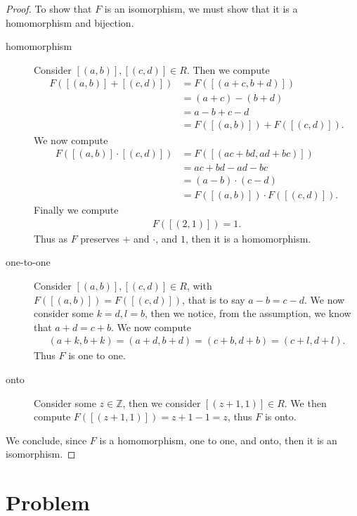 \documentclass[10pt]{armath}
\newcommand{\Z}{\mathbb{Z}}
\newcommand{\ra}{\rightarrow}
\newenvironment{claim}[1]{\par\noindent\textit{Claim:}\space#1}{}
\begin{document}
\begin{proof}
  To show that $F$ is an isomorphism, we must show that it is a homomorphism
  and bijection.
  \begin{description}
    \item[homomorphism] Consider $[(a,b)],[(c,d)]\in R$. Then we compute
      \begin{align*}
        F([(a,b)]+[(c,d)])&=F([(a+c,b+d)])\\
        &=(a+c)-(b+d)\\
        &=a-b+c-d\\
        &=F([(a,b)])+F([(c,d)]).
      \end{align*}
      We now compute
      \begin{align*}
        F([(a,b)]\cdot[(c,d)])&=F([(ac+bd,ad+bc)])\\
        &=ac+bd-ad-bc\\
        &=(a-b)\cdot(c-d)\\
        &=F([(a,b)])\cdot F([(c,d)]).
      \end{align*}
      Finally we compute
      \begin{align*}
        F([(2,1)])=1.
      \end{align*}
      Thus as $F$ preserves $+$ and $\cdot$, and $1$, then it is a
      homomorphism.
    \item[one-to-one] Consider $[(a,b)],[(c,d)]\in R$, with
      $F([(a,b)])=F([(c,d)])$, that is to say $a-b=c-d$. We now consider some
      $k=d,l=b$, then we notice, from the assumption, we know that $a+d=c+b$.
      We now compute
      \begin{align*}
        (a+k,b+k)=(a+d,b+d)=(c+b,d+b)=(c+l,d+l).
      \end{align*}
      Thus $F$ is one to one.
    \item[onto] Consider some $z\in\Z$, then we consider $[(z+1,1)]\in R$. We
      then compute $F([(z+1,1)])=z+1-1=z$, thus $F$ is onto.
  \end{description}
  We conclude, since $F$ is a homomorphism, one to one, and onto, then it is an
  isomorphism.
\end{proof}

\section{Problem}%
\label{sec:problem_2}
\end{document}
